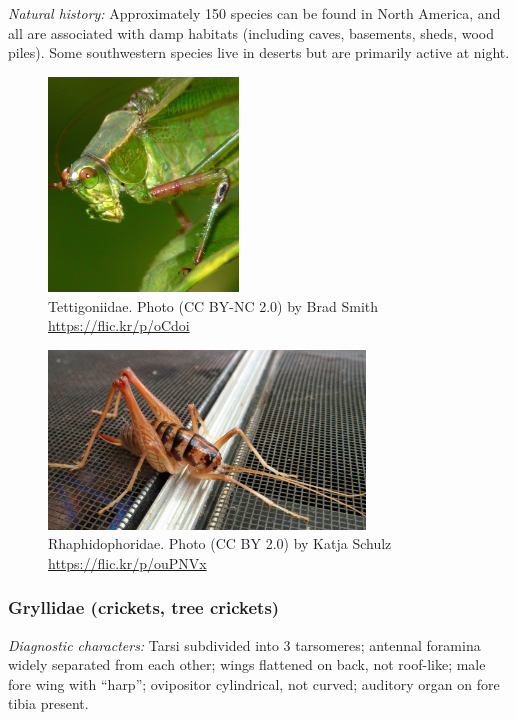 \documentclass[letterpaper, 11pt]{article}
\begin{document}
\noindent{}\textit{Natural history:} Approximately 150 species can be found in North America, and all are associated with damp habitats (including caves, basements, sheds, wood piles). Some southwestern species live in deserts but are primarily active at night.\\

\begin{figure}[ht!]
  \centering
    \includegraphics[width=0.45\textwidth]{tetti2}
  \caption{Tettigoniidae. Photo (CC BY-NC 2.0) by Brad Smith \url{https://flic.kr/p/oCdoi}}
  \label{fig:tettihead}
\end{figure}

\begin{figure}[ht!]
  \centering
    \includegraphics[width=0.75\textwidth]{rhaphid}
  \caption{Rhaphidophoridae. Photo (CC BY 2.0) by Katja Schulz \url{https://flic.kr/p/ouPNVx}}
  \label{fig:rhaphid}
\end{figure}

\subsubsection{Gryllidae (crickets, tree crickets)}
\noindent{}\textit{Diagnostic characters:} Tarsi subdivided into 3 tarsomeres; antennal foramina widely separated from each other; wings flattened on back, not roof-like; male fore wing with ``harp''; ovipositor cylindrical, not curved; auditory organ on fore tibia present.\\
\end{document}
